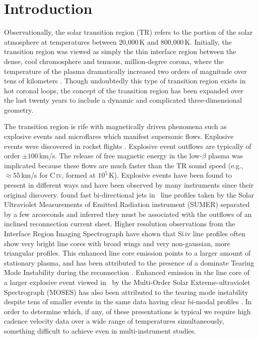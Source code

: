 

\section{Introduction}

    Observationally, the solar transition region (TR) refers to the portion of the solar atmosphere at temperatures between 20,000\,K and 800,000\,K. 
    Initially, the transition region was viewed as simply the thin interface region between the dense, cool chromosphere and tenuous, million-degree corona, where the temperature of the plasma dramatically increased two orders of magnitude over tens of kilometers \citep[see][and references therein]{tian2017}. 
    Though undoubtedly this type of transition region exists in hot coronal loops, the concept of the transition region has been expanded over the last twenty years to include a dynamic and complicated three-dimensional geometry. 
    
    The transition region is rife with magnetically driven phenomena such as explosive events \cite[e.g.,][]{dere1991} and microflares \citep{gontikakis2012} which manifest supersonic flows.
    Explosive events were discovered in rocket flights \citep{Dere1989}. 
    Explosive event outflows are typically of order $\pm 100$\,km/s. 
    The release of free magnetic energy in the low-$\beta$ plasma was implicated because these flows are much faster than the TR sound speed (e.g., $\approx55$\,km/s  for C\,\textsc{iv}, formed at $10^5$\,K).
    Explosive events have been found to present in different ways and have been observed by many instruments since their original discovery.
    \citet{innes1997} found fast bi-directional jets in \siiv \ line profiles taken by the Solar Ultraviolet Measurements of Emitted Radiation instrument (SUMER)  \citep{SUMER} separated by a few arcseconds and inferred they must be associated with the outflows of an inclined reconnection current sheet.
    Higher resolution observations from the Interface Region Imaging Spectrograph \citep[IRIS]{depontieu2014} have shown that Si\,{\sc iv} line profiles often show very bright line cores with broad wings and very non-gaussian, more triangular profiles.
    This enhanced line core emission points to a larger amount of stationary plasma, and has been attributed to the presence of a dominate Tearing Mode Instability during the reconnection \citep{Innes2015}.
    Enhanced emission in the line core of a larger explosive event viewed in \heii \ by the Multi-Order Solar Extreme-ultraviolet Spectrograph (MOSES)  has also been attributed to the tearing mode instability \citep{Fox2010} despite tens of smaller events in the same data having clear bi-modal profiles \citep{Rust2019}.
    In order to determine which, if any, of these presentations is typical we require high cadence velocity data over a wide range of temperatures simultaneously, something difficult to achieve even in multi-instrument studies.
    
